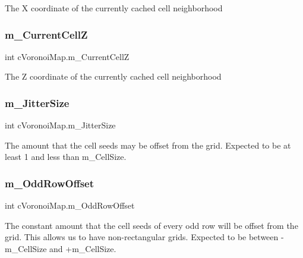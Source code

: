 The X coordinate of the currently cached cell neighborhood \mbox{\label{classc_voronoi_map_a8d4fa63e05ea65cec36e4a09bd2433c0}} 
\subsubsection{\texorpdfstring{m\+\_\+\+Current\+CellZ}{m\_CurrentCellZ}}
{\footnotesize\ttfamily int c\+Voronoi\+Map.\+m\+\_\+\+Current\+CellZ\hspace{0.3cm}{\ttfamily [protected]}}

The Z coordinate of the currently cached cell neighborhood \mbox{\label{classc_voronoi_map_a4645ec081dfc565552f244fc4bd1ec01}} 
\subsubsection{\texorpdfstring{m\+\_\+\+Jitter\+Size}{m\_JitterSize}}
{\footnotesize\ttfamily int c\+Voronoi\+Map.\+m\+\_\+\+Jitter\+Size\hspace{0.3cm}{\ttfamily [protected]}}

The amount that the cell seeds may be offset from the grid. Expected to be at least 1 and less than m\+\_\+\+Cell\+Size. \mbox{\label{classc_voronoi_map_ad9ad1936c8ef202c65c51d4524684094}} 
\subsubsection{\texorpdfstring{m\+\_\+\+Odd\+Row\+Offset}{m\_OddRowOffset}}
{\footnotesize\ttfamily int c\+Voronoi\+Map.\+m\+\_\+\+Odd\+Row\+Offset\hspace{0.3cm}{\ttfamily [protected]}}

The constant amount that the cell seeds of every odd row will be offset from the grid. This allows us to have non-\/rectangular grids. Expected to be between -\/m\+\_\+\+Cell\+Size and +m\+\_\+\+Cell\+Size. \mbox{\label{classc_voronoi_map_a66f740639832ef2ac10e9031387cbd27}} 
